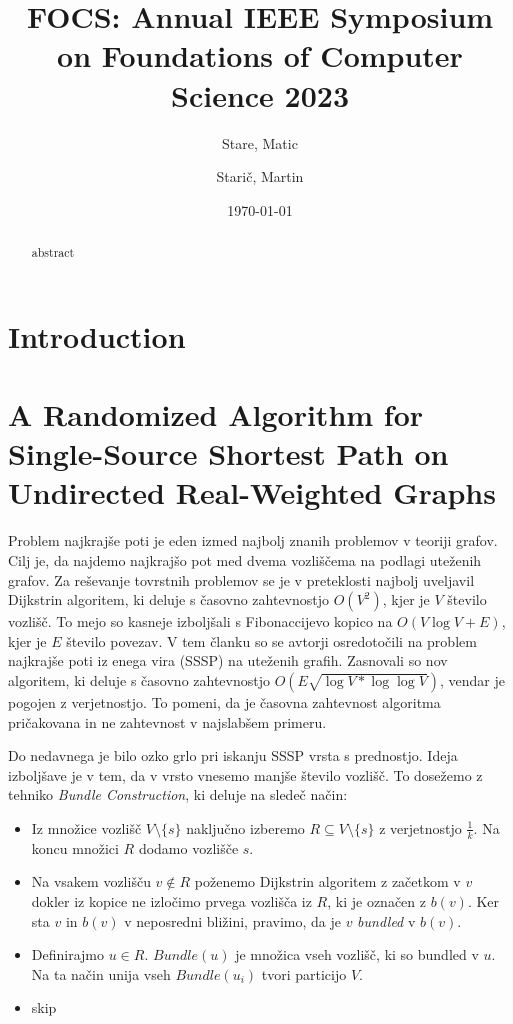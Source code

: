 \documentclass{article}
\title{FOCS: Annual IEEE Symposium on Foundations of Computer Science 2023}
\author{
  Stare, Matic\\
  \and
  Starič, Martin\\
}
\date{\today}
\begin{document}
\maketitle

\tableofcontents
\newpage


\begin{abstract}
    abstract
\end{abstract}



\section{Introduction}

\section{A Randomized Algorithm for Single-Source Shortest Path on Undirected Real-Weighted Graphs}

Problem najkrajše poti je eden izmed najbolj znanih problemov v teoriji grafov. Cilj je, da najdemo najkrajšo pot med dvema vozliščema na podlagi uteženih grafov. Za reševanje tovrstnih problemov se je v preteklosti najbolj uveljavil Dijkstrin algoritem, ki deluje s časovno zahtevnostjo $O(V^2)$, kjer je $V$ število vozlišč. To mejo so kasneje izboljšali s Fibonaccijevo kopico na $O(V \log V + E)$, kjer je $E$ število povezav. V tem članku so se avtorji osredotočili na problem najkrajše poti iz enega vira (SSSP) na uteženih grafih. Zasnovali so nov algoritem, ki deluje s časovno zahtevnostjo $O(E \sqrt{\log V * \log \log V})$, vendar je pogojen z verjetnostjo. To pomeni, da je časovna zahtevnost algoritma pričakovana in ne zahtevnost v najslabšem primeru. 

Do nedavnega je bilo ozko grlo pri iskanju SSSP vrsta s prednostjo. Ideja izboljšave je v tem, da v vrsto vnesemo manjše število vozlišč. To dosežemo z tehniko \textit{Bundle Construction}, ki deluje na sledeč način:
\begin{itemize}
  \item Iz množice vozlišč $V \setminus \{s\}$ naključno izberemo $R \subseteq V \setminus \{s\}$ z verjetnostjo $\frac{1}{k}$. Na koncu množici $R$ dodamo vozlišče $s$.
  \item Na vsakem vozlišču $v \notin R$ poženemo Dijkstrin algoritem z začetkom v $v$ dokler iz kopice ne izločimo prvega vozlišča iz $R$, ki je označen z $b(v)$. Ker sta $v$ in $b(v)$ v neposredni bližini, pravimo, da je $v$ \textit{bundled} v $b(v)$.
  \item Definirajmo $u \in R$. $Bundle(u)$ je množica vseh vozlišč, ki so bundled v $u$. Na ta način unija vseh $Bundle(u_i)$ tvori particijo $V$.
  \item skip
\end{itemize}
\end{document}
